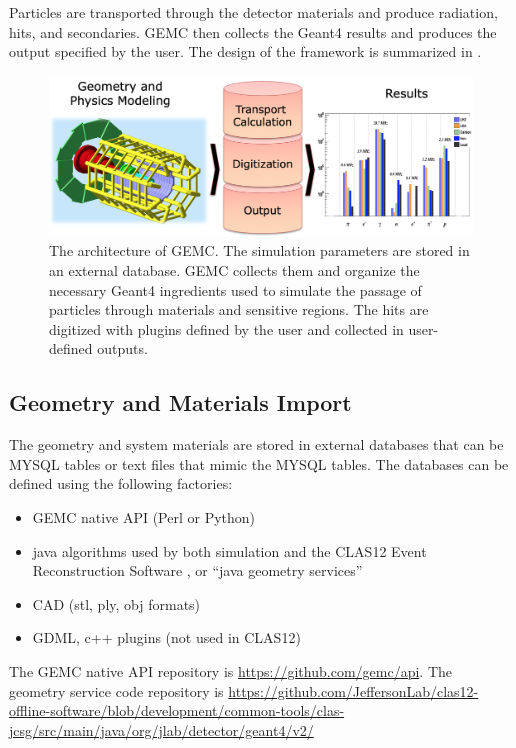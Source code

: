 Particles are transported through the detector materials and produce radiation, hits, and secondaries.
GEMC then collects the Geant4 results and produces the output specified by the user.
The design of the framework is summarized in .

\begin{figure}
	\centering
	\includegraphics[width=1.0\columnwidth,keepaspectratio]{img/gemcDesign.png}
	\caption{The architecture of GEMC. The simulation parameters are stored in an external database. GEMC collects
             them and organize the necessary Geant4 ingredients used to simulate the
             passage of particles through materials and sensitive regions. The hits are digitized with
             plugins defined by the user and collected in user-defined outputs.  }
	\label{fig:gemcDesign}
\end{figure}



\subsection{Geometry and Materials Import}

The geometry and system materials are stored in external databases that can be MYSQL tables or text files that mimic the MYSQL tables.
The databases can be defined using the following factories:

\begin{itemize}
	\item GEMC native API (Perl or Python)
	\item java algorithms used by both simulation and the CLAS12 Event Reconstruction Software \cite{recon-nim}, or ``java geometry services''
	\item CAD (stl, ply, obj formats)
	\item GDML, c++ plugins (not used in CLAS12)
\end{itemize}

The GEMC native API repository is \url{https://github.com/gemc/api}. The geometry service code repository is
\url{https://github.com/JeffersonLab/clas12-offline-software/blob/development/common-tools/clas-jcsg/src/main/java/org/jlab/detector/geant4/v2/}


